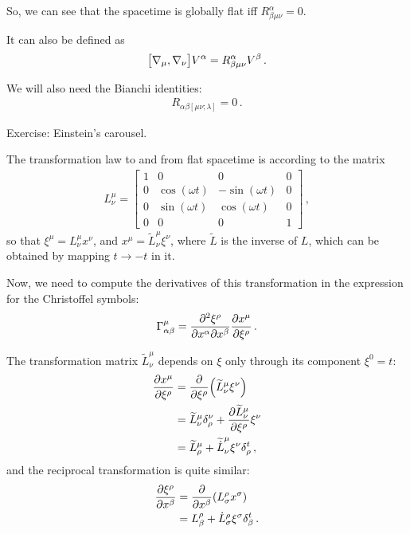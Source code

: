 \documentclass[main.tex]{subfiles}
\begin{document}
So, we can see that the spacetime is globally flat iff \(R^{\alpha }_{\beta \mu \nu } = 0\). 

It can also be defined as 
%
\begin{align}
\qty[\nabla_\mu, \nabla_\nu ] V^{\alpha } = R^{\alpha }_{\beta \mu \nu } V^{\beta }
\,.
\end{align}

We will also need the Bianchi identities: 
%
\begin{align}
R_{\alpha \beta [ \mu \nu ; \lambda ]} = 0
\,.
\end{align}

\begin{extracontent}
Exercise: Einstein's carousel. 

The transformation law to and from flat spacetime is according to the matrix
%
\begin{align}
L^{\mu }_{\nu }= \left[\begin{array}{cccc}
1 & 0 & 0 & 0 \\ 
0 & \cos ( \omega t)  & - \sin ( \omega t)  & 0 \\ 
0 & \sin ( \omega t)  & \cos ( \omega t)  & 0 \\ 
0 & 0 & 0 & 1
\end{array}\right]
\,,
\end{align}
%
so that \(\xi^{\mu } = L^{\mu }_{\nu } x^{\nu }\), and \(x^{\mu } = \widetilde{L}^{\mu }_{\nu } \xi^{\nu }\), where \(\widetilde{L}\) is the inverse of \(L\), which can be obtained by mapping \(t \to -t\) in it. 

Now, we need to compute the derivatives of this transformation in the expression for the Christoffel symbols: 
%
\begin{align}
\Gamma^{\mu }_{\alpha \beta } = \pdv{\xi^{\rho }}{x^{\alpha }}{x^{\beta }} \pdv{x^{\mu }}{\xi^{\rho }}
\,.
\end{align}

The transformation matrix \(\widetilde{L}^{\mu }_{\nu }\) depends on \(\xi \) only through its component \(\xi^{0} = t\):
%
\begin{align}
\pdv{x^{\mu }}{\xi^{\rho }} &= \pdv{}{\xi^{\rho }} \qty(\widetilde{L}^{\mu }_{\nu } \xi^{\nu })  \\
&= \widetilde{L}^{\mu }_{\nu } \delta^{\nu }_{\rho } + \pdv{\widetilde{L}^{\mu }_{\nu }}{\xi^{\rho }} \xi^{\nu }  \\
&= \widetilde{L}^{\mu }_{\rho } + \widetilde{\dot{L}}^{\mu }_{\nu } \xi^{\nu } \delta^{t}_{\rho }
\,,
\end{align}
%
and the reciprocal transformation is quite similar: 
%
\begin{align}
\pdv{\xi^{\rho }}{x^{\beta }} &= \pdv{}{x^{\beta }} \qty(L^{\rho }_{\sigma } x^{\sigma })  \\
&= L^{\rho }_{\beta } + \dot{L}^{\rho }_{\sigma  } \xi^{\sigma } \delta^{t}_{\beta }
\,.
\end{align}


\end{extracontent}
\end{document}

